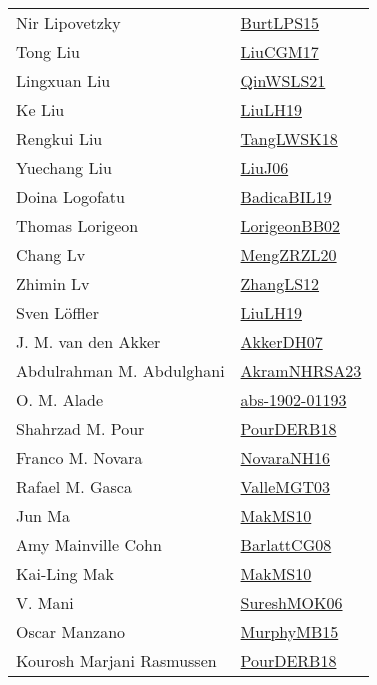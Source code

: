 {\begin{longtable}{p{4cm}p{20cm}}
Nir Lipovetzky & \href{papers/BurtLPS15.pdf}{BurtLPS15}\cite{BurtLPS15} \\
Tong Liu & \href{papers/LiuCGM17.pdf}{LiuCGM17}\cite{LiuCGM17} \\
Lingxuan Liu & \href{articles/QinWSLS21.pdf}{QinWSLS21}\cite{QinWSLS21} \\
Ke Liu & \href{papers/LiuLH19.pdf}{LiuLH19}\cite{LiuLH19} \\
Rengkui Liu & \href{}{TangLWSK18}\cite{TangLWSK18} \\
Yuechang Liu & \href{papers/LiuJ06.pdf}{LiuJ06}\cite{LiuJ06} \\
Doina Logofatu & \href{papers/BadicaBIL19.pdf}{BadicaBIL19}\cite{BadicaBIL19} \\
Thomas Lorigeon & \href{}{LorigeonBB02}\cite{LorigeonBB02} \\
Chang Lv & \href{articles/MengZRZL20.pdf}{MengZRZL20}\cite{MengZRZL20} \\
Zhimin Lv & \href{papers/ZhangLS12.pdf}{ZhangLS12}\cite{ZhangLS12} \\
Sven L{\"{o}}ffler & \href{papers/LiuLH19.pdf}{LiuLH19}\cite{LiuLH19} \\
J. M. van den Akker & \href{papers/AkkerDH07.pdf}{AkkerDH07}\cite{AkkerDH07} \\
Abdulrahman M. Abdulghani & \href{articles/AkramNHRSA23.pdf}{AkramNHRSA23}\cite{AkramNHRSA23} \\
O. M. Alade & \href{articles/abs-1902-01193.pdf}{abs-1902-01193}\cite{abs-1902-01193} \\
Shahrzad M. Pour & \href{articles/PourDERB18.pdf}{PourDERB18}\cite{PourDERB18} \\
Franco M. Novara & \href{articles/NovaraNH16.pdf}{NovaraNH16}\cite{NovaraNH16} \\
Rafael M. Gasca & \href{papers/ValleMGT03.pdf}{ValleMGT03}\cite{ValleMGT03} \\
Jun Ma & \href{papers/MakMS10.pdf}{MakMS10}\cite{MakMS10} \\
Amy Mainville Cohn & \href{papers/BarlattCG08.pdf}{BarlattCG08}\cite{BarlattCG08} \\
Kai{-}Ling Mak & \href{papers/MakMS10.pdf}{MakMS10}\cite{MakMS10} \\
V. Mani & \href{}{SureshMOK06}\cite{SureshMOK06} \\
Oscar Manzano & \href{papers/MurphyMB15.pdf}{MurphyMB15}\cite{MurphyMB15} \\
Kourosh Marjani Rasmussen & \href{articles/PourDERB18.pdf}{PourDERB18}\cite{PourDERB18} \\

\end{longtable}}
